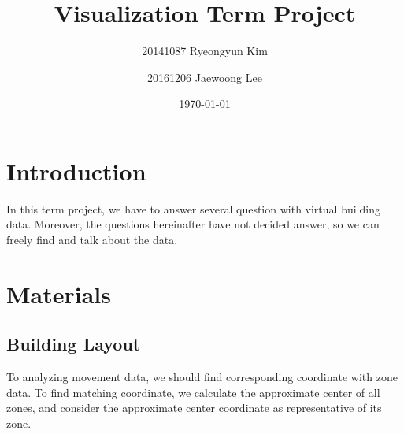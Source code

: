 \documentclass[aps, 10pt, a4paper]{article}
\title{Visualization Term Project}
\author{20141087 Ryeongyun Kim \and 20161206 Jaewoong Lee}
\date{\today}
\begin{document}
    \maketitle
    \newpage
    
    \tableofcontents
    \listoftables
    \listoffigures
    \newpage
    
    \section{Introduction}
        In this term project, we have to answer several question with virtual building data. Moreover, the questions hereinafter have not decided answer, so we can freely find and talk about the data.
    
    \section{Materials}
        \subsection{Building Layout}
            To analyzing movement data, we should find corresponding coordinate with zone data. To find matching coordinate, we calculate the approximate center of all zones, and consider the approximate center coordinate as representative of its zone. 
        
\end{document}
